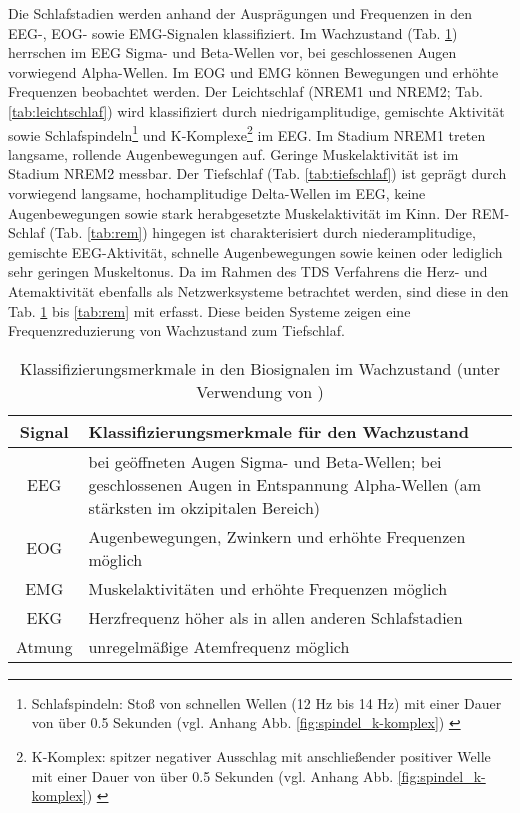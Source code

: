 Die Schlafstadien werden anhand der Ausprägungen und Frequenzen in den \acs{EEG}-, \acs{EOG}- sowie \acs{EMG}-Signalen klassifiziert. Im Wachzustand (Tab. \ref{tab:wach}) herrschen im \acs{EEG} Sigma- und Beta-Wellen vor, bei geschlossenen Augen vorwiegend Alpha-Wellen. Im \acs{EOG} und \acs{EMG} können Bewegungen und erhöhte Frequenzen beobachtet werden. Der Leichtschlaf (\acs{NREM}1 und \acs{NREM}2; Tab. \ref{tab:leichtschlaf}) wird klassifiziert durch niedrigamplitudige, gemischte Aktivität sowie Schlafspindeln\footnote{Schlafspindeln: Stoß von schnellen Wellen (12 Hz bis 14 Hz) mit einer Dauer von über 0.5 Sekunden (vgl. Anhang Abb. \ref{fig:spindel_k-komplex}) \parencite{lee-chiong_sleep_2008}} und K-Komplexe\footnote{K-Komplex: spitzer negativer Ausschlag mit anschließender positiver Welle mit einer Dauer von über 0.5 Sekunden (vgl. Anhang Abb. \ref{fig:spindel_k-komplex}) \parencite{lee-chiong_sleep_2008}} im \acs{EEG}. Im Stadium \acs{NREM}1 treten langsame, rollende Augenbewegungen auf. Geringe Muskelaktivität ist im Stadium \acs{NREM}2 messbar. Der Tiefschlaf (Tab. \ref{tab:tiefschlaf}) ist geprägt durch vorwiegend langsame, hochamplitudige Delta-Wellen im \acs{EEG}, keine Augenbewegungen sowie stark herabgesetzte Muskelaktivität im Kinn. Der \acs{REM}-Schlaf (Tab. \ref{tab:rem}) hingegen ist charakterisiert durch niederamplitudige, gemischte \acs{EEG}-Aktivität, schnelle Augenbewegungen sowie keinen oder lediglich sehr geringen Muskeltonus. Da im Rahmen des \acs{TDS} Verfahrens die Herz- und Atemaktivität ebenfalls als Netzwerksysteme betrachtet werden, sind diese in den Tab. \ref{tab:wach} bis \ref{tab:rem} mit erfasst. Diese beiden Systeme zeigen eine Frequenzreduzierung von Wachzustand zum Tiefschlaf. \parencite{lee-chiong_sleep_2008, steinberg_schlafmedizin_2010, rasche_update_2003, ebner_eeg_2006}

\begin{table}[H] 
\begin{small}
\begin{tabularx}{\textwidth}{cX}
\toprule
\multicolumn{1}{c}{\textbf{Signal}} & \multicolumn{1}{l}{\textbf{Klassifizierungsmerkmale für den Wachzustand}}\\  
\midrule
\acs{EEG} & bei geöffneten Augen Sigma- und Beta-Wellen; bei geschlossenen Augen in Entspannung Alpha-Wellen (am stärksten im okzipitalen Bereich)\\
\acs{EOG} & Augenbewegungen, Zwinkern und erhöhte Frequenzen möglich\\
\acs{EMG} & Muskelaktivitäten und erhöhte Frequenzen möglich\\
\acs{EKG} & Herzfrequenz höher als in allen anderen Schlafstadien\\
Atmung & unregelmäßige Atemfrequenz möglich\\
\bottomrule
\end{tabularx}
\caption[Klassifizierungsmerkmale im Wachzustand]{Klassifizierungsmerkmale in den Biosignalen im Wachzustand (unter Verwendung von \parencite{lee-chiong_sleep_2008, steinberg_schlafmedizin_2010, rasche_update_2003, ebner_eeg_2006})}
\label{tab:wach}
\end{small}
\end{table}


